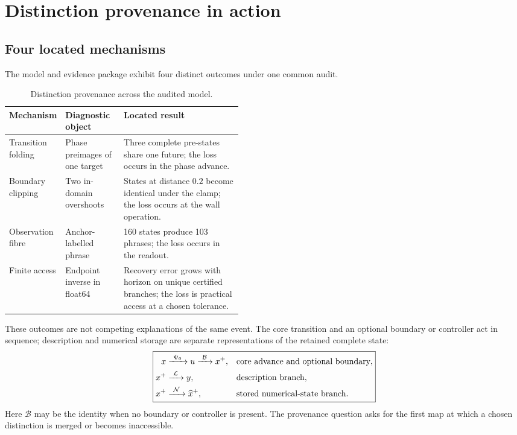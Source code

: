 \section{Distinction provenance in action}
\label{sec:demonstrations}

\subsection{Four located mechanisms}

The model and evidence package exhibit four distinct outcomes under one common audit.

\begin{table}[H]
\centering
\caption{Distinction provenance across the audited model.}
\label{tab:provenance}
\small
\begin{tabularx}{\linewidth}{@{}p{0.20\linewidth}p{0.25\linewidth}X@{}}
\toprule
Mechanism & Diagnostic object & Located result\\
\midrule
Transition folding &
Phase preimages of one target &
Three complete pre-states share one future; the loss occurs in the phase advance.\\
Boundary clipping &
Two in-domain overshoots &
States at distance \(0.2\) become identical under the clamp; the loss occurs at the wall operation.\\
Observation fibre &
Anchor-labelled phrase &
160 states produce 103 phrases; the loss occurs in the readout.\\
Finite access &
Endpoint inverse in float64 &
Recovery error grows with horizon on unique certified branches; the loss is practical access at a chosen tolerance.\\
\bottomrule
\end{tabularx}
\end{table}

These outcomes are not competing explanations of the same event. The core transition and an optional boundary or controller act in sequence; description and numerical storage are separate representations of the retained complete state:
\begin{equation}
\boxed{
\begin{aligned}
x&\xrightarrow{\ \Psi_0\ }u\xrightarrow{\ \mathcal B\ }x^+,
&&\text{core advance and optional boundary},\\
x^+&\xrightarrow{\ \mathcal L\ }y,
&&\text{description branch},\\
x^+&\xrightarrow{\ \mathcal N\ }\widehat{x}^{+},
&&\text{stored numerical-state branch}.
\end{aligned}
}
\label{eq:pipeline}
\end{equation}
Here \(\mathcal B\) may be the identity when no boundary or controller is present. The provenance question asks for the first map at which a chosen distinction is merged or becomes inaccessible.

